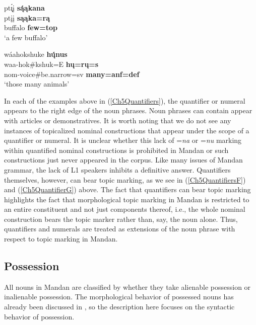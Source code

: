 \begin{exe}
\begin{xlist}
    \item\label{Ch5QuantifiersF} \glll pt\'{ı̨}į \textbf{są́ąkana}\\
    ptįį \textbf{sąąka=rą}\\
    \textnormal{buffalo} \textnormal{\bfseries few}\textbf{=top}\\
    \glt `a few buffalo' \citep[79]{hollow1973b}

    \item\label{Ch5QuantifierG} \glll wáahokshuke \textbf{hų́nus}\\
    waa-hok\#kshuk=E \textbf{hų=rų=s}\\
    nom-\textnormal{voice}\#\textnormal{be.narrow}=sv \textnormal{\bfseries many}\textbf{=anf=def}\\
    \glt `those many animals' \citep[45]{hollow1973a}
    \end{xlist}
\end{exe}

In each of the examples above in (\ref{Ch5Quantifiers}), the quantifier or numeral appears to the right edge of the noun phrases. Noun phrases can contain appear with articles or demonstratives. It is worth noting that we do not see any instances of topicalized nominal constructions that appear under the scope of a quantifier or numeral. It is unclear whether this lack of =\textit{na} or =\textit{nu} marking within quantified nominal constructions is prohibited in Mandan or such constructions just never appeared in the corpus. Like many issues of Mandan grammar, the lack of L1 speakers inhibits a definitive answer. Quantifiers themselves, however, can bear topic marking, as we see in (\ref{Ch5QuantifiersF}) and (\ref{Ch5QuantifierG}) above. The fact that quantifiers can bear topic marking highlights the fact that morphological topic marking in Mandan is restricted to an entire constituent and not just components thereof, i.e., the whole nominal construction bears the topic marker rather than, say, the noun alone. Thus, quantifiers and numerals are treated as extensions of the noun phrase with respect to topic marking in Mandan.

\subsection{Possession}\label{Ch5Possession}

All nouns in Mandan are classified by whether they take alienable possession or inalienable possession. The morphological behavior of possessed nouns has already been discussed in , so the description here focuses on the syntactic behavior of possession.

